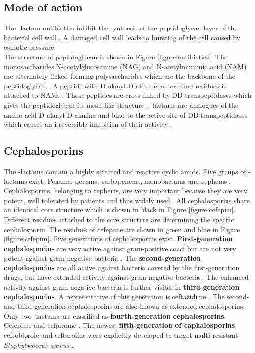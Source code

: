 \subsection{Mode of action}
The \textbeta-lactam antibiotics inhibit the synthesis of the peptidoglycan layer of the bacterial cell wall \cite{fisher_bacterial_2005}. A damaged cell wall leads to bursting of the cell caused by osmotic pressure. \\
The structure of peptidoglycan is shown in Figure \ref{figure:antibiotics}. 
The monosaccharides  N-acetylglucosamine (NAG) and N-acetylmuramic acid (NAM) are alternately linked forming polysaccharides which are the backbone of the peptidoglycan \cite{fisher_bacterial_2005}.
A peptide with D-alanyl-D-alanine as terminal residues is attached to NAMs \cite{fisher_bacterial_2005}. Those peptides are cross-linked by DD-transpeptidases which gives the peptidoglycan its mesh-like structure \cite{fisher_bacterial_2005}. \textbeta-lactams are analogues of the amino acid D-alanyl-D-alanine and bind to the active site of DD-transpeptidases which causes an irreversible inhibition of their activity \cite{fisher_bacterial_2005}. 

\subsection{Cephalosporins}
The \textbeta-lactams contain a highly strained and reactive cyclic amide. Five groups of \textbeta-lactams exist: Penams, penems, carbapenems, monobactams and cephems \cite{beta-lactam_nodate}. 
Cephalosporins, belonging to cephems, are very important because they are very potent, well tolerated by patients and thus widely used \cite{dancer_problem_2001}. 
All cephalosporins share an identical core structure which is shown in black in Figure \ref{figure:cefepim}. Different residues attached to the core structure are determining the specific cephalosporin. The residues of cefepime are shown in green and blue in Figure \ref{figure:cefepim}. Five generations of cephalosporins exist.
\textbf{First-generation cephalosporins} are very active against gram-positive cocci but are not very potent against gram-negative bacteria \cite{fernandes_-lactams:_2013}. The \textbf{second-generation cephalosporins} are all active against bacteria covered by the first-generation drugs, but have extended activity against gram-negative bacteria \cite{fernandes_-lactams:_2013}. The enhanced activity against gram-negative bacteria is further visible in \textbf{third-generation cephalosporins}. A representative of this generation is ceftazidime \cite{klein_third-generation_1995}. The second- and third-generation cephalosporins are also known as extended cephalosporins. Only two \textbeta-lactams are classified as \textbf{fourth-generation cephalosporins}: Cefepime and cefpirome \cite{fernandes_-lactams:_2013}. The newest \textbf{fifth-generation of caphalosporins} ceftobiprole and ceftaroline  were explicitly developed to target multi resistant \textit{Staphylococcus aureus} \cite{fernandes_-lactams:_2013}.

